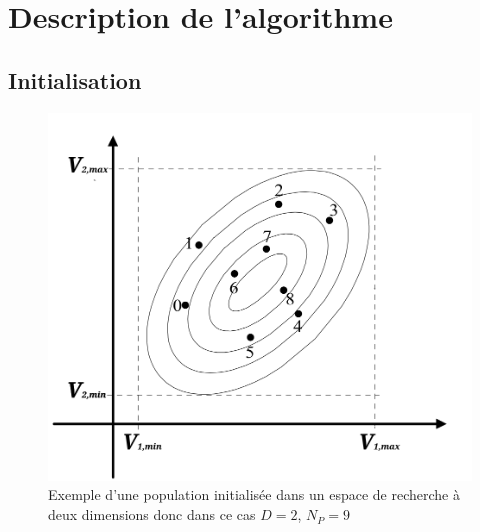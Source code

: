 \section{Description de l'algorithme}

\subsection{Initialisation}

\begin{figure}
  \vspace*{-10pt}
  \begin{center}
    \includegraphics[width=\textwidth]{resources/initpop.png}
    \caption{Exemple d'une population initialisée dans un espace de recherche à deux dimensions donc dans ce cas $D = 2$, $N_P = 9$ }
    \label{fig:initpop}
        \vspace{30pt}
  \end{center}

\end{figure}

